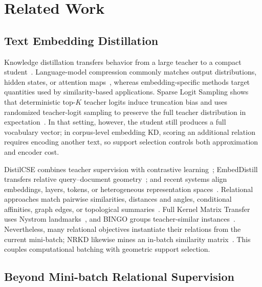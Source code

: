\section{Related Work}

\subsection{Text Embedding Distillation}


Knowledge distillation transfers behavior from a large teacher to a compact student~\citep{hinton2015distilling}. Language-model compression commonly matches output distributions, hidden states, or attention maps~\citep{sanh2019distilbert,jiao2019tinybert,wang2020minilm,xu2024survey}, whereas embedding-specific methods target quantities used by similarity-based applications. Sparse Logit Sampling shows that deterministic top-$K$ teacher logits induce truncation bias and uses randomized teacher-logit sampling to preserve the full teacher distribution in expectation~\citep{anshumann2025sparse}. In that setting, however, the student still produces a full vocabulary vector; in corpus-level embedding KD, scoring an additional relation requires encoding another text, so support selection controls both approximation and encoder cost.

DistilCSE combines teacher supervision with contrastive learning~\citep{gao2021distilcse,xu2023distillcse}; EmbedDistill transfers relative query--document geometry~\citep{kim2023embeddistill}; and recent systems align embeddings, layers, tokens, or heterogeneous representation spaces~\citep{lee2024gecko,zhang2024jasperstella,vujanic2025leaf,truong2025emo,dao2026talas,akram2026jinaembeddingsv5}. Relational approaches match pairwise similarities, distances and angles, conditional affinities, graph edges, or topological summaries~\citep{tung2019similarity,park2019rkd,passalis2020pkt,liu2019irg,kim2024topkd}. Full Kernel Matrix Transfer uses Nystrom landmarks~\citep{qian2022fullkernel}, and BINGO groups teacher-similar instances~\citep{xu2022bingo}. Nevertheless, many relational objectives instantiate their relations from the current mini-batch; NRKD likewise mines an in-batch similarity matrix~\citep{xin2025nrkd}. This couples computational batching with geometric support selection.

\subsection{Beyond Mini-batch Relational Supervision}

